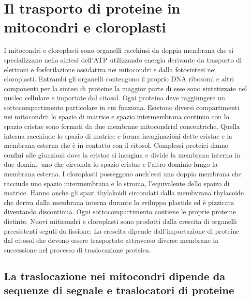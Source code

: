 \section{Il trasporto di proteine in mitocondri e cloroplasti}
I mitocondri e cloroplasti sono organelli racchiusi da doppia membrana che si specializzano nella sintesi dell'ATP utilizzando energia derivante da trasporto di elettroni e
fosforilazione ossidativa nei mitocondri e dalla fotosintesi nei cloroplasti. Entrambi gli organelli contengono il proprio DNA ribosomi e altri componenti per la sintesi di proteine
la maggior parte di esse sono sintetizzate nel nucleo cellulare e importate dal citosol. Ogni proteina deve raggiungere un sottocompartimento particolare in cui funziona. Esistono 
diversi compartimenti nei mitocondri: lo spazio di matrice e spazio intermembrana continuo con lo spazio cristae sono formati da due membrane mitocondrial concentriche. Quella 
interna racchiude lo spazio di matrice e forma invaginazioni dette cristae e la membrana esterna che \`e in contatto con il citosol. Complessi proteici danno confini alle 
giunzioni dove la cristae si incagina e divide la membrana interna in due domini: uno che circonda lo spazio cristae e l'altro dominio lungo la membrana esterna. I cloroplasti posseggono
anch'essi una doppia membrana che racciude uno spazio intermembrana e lo stroma, l'equivalente dello spaizo di matrice. Hanno anche gli spazi thylakoidi circondati dalla membvrana
thylacoide che deriva dalla membrana interna durante lo sviluppo plastide ed \`e pizzicata diventando discontinua. Ogni sottocompartimento contiene le proprie proteine distinte. 
Nuovi miticondri e cloroplasti sono prodotti dalla crescita di organelli preesistenti seguti da fissione. La crescita dipende dall'importazione di proteine dal citosol che devono 
essere trasportate attraverso diverse membrane in successione nel processo di traslocazione proteica. 
\subsection{La traslocazione nei mitocondri dipende da sequenze di segnale e traslocatori di proteine}
